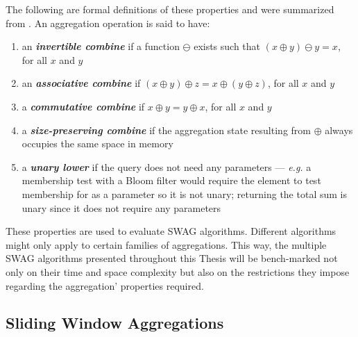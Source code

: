 The following are formal definitions of these properties and were summarized from \cite{Tangwongsan-Sliding-Window-Aggregation-Algorithms}. An aggregation operation is said to have:

\begin{enumerate}
    \item  an \textbf{\textit{invertible combine}} if a function $\ominus$ exists such that $(x \oplus y) \ominus y = x$, for all $x$ and $y$
    
    \item  an \textbf{\textit{associative combine}} if $(x \oplus y) \oplus z = x \oplus (y \oplus z)$, for all $x$ and $y$
    
    \item  a \textbf{\textit{commutative combine}} if $x \oplus y = y \oplus x$, for all $x$ and $y$
    
    \item  a \textbf{\textit{size-preserving combine}} if the aggregation state resulting from $\oplus$ always occupies the same space in memory
   
    \item  a \textbf{\textit{unary lower}} if the query does not need any parameters --- \textit{e.g.} a membership test with a Bloom filter would require the element to test membership for as a parameter so it is not unary; returning the total sum is unary since it does not require any parameters
\end{enumerate}

These properties are used to evaluate SWAG algorithms. Different algorithms might only apply to certain families of aggregations. This way, the multiple SWAG algorithms presented throughout this Thesis will be bench-marked not only on their time and space complexity but also on the restrictions they impose regarding the aggregation' properties required.

\subsection{Sliding Window Aggregations}

